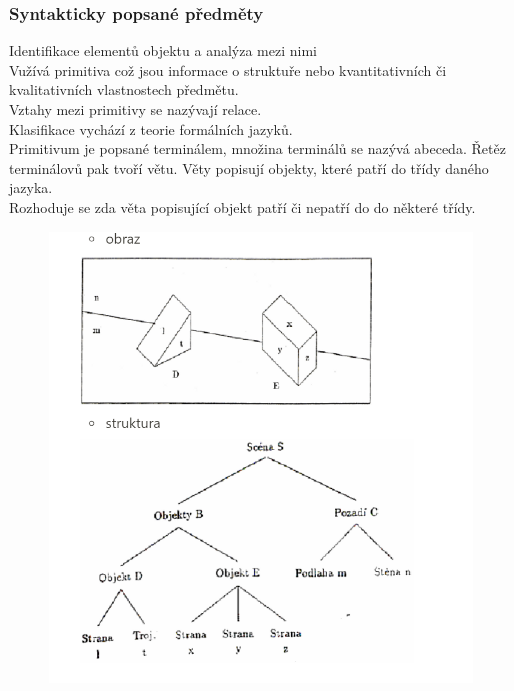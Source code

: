 \subsubsection{Syntakticky popsané předměty}

Identifikace elementů objektu a analýza mezi nimi\\
Vužívá primitiva což jsou informace o struktuře nebo kvantitativních či kvalitativních vlastnostech předmětu.\\
Vztahy mezi primitivy se nazývají relace.\\
Klasifikace vychází z teorie formálních jazyků.\\
Primitivum je popsané terminálem, množina terminálů se nazývá abeceda. Řetěz terminálovů pak tvoří větu. Věty popisují objekty, které patří do třídy daného jazyka.\\
Rozhoduje se zda věta popisující objekt patří či nepatří do do některé třídy.\\
\begin{figure}[H]
    \includegraphics[scale = 0.7]{images/syntakticke.png}
\end{figure}
